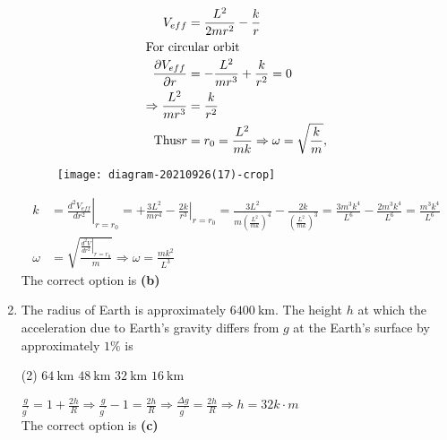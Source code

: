 \begin{enumerate}
\begin{answer}
	\begin{minipage}{0.5\textwidth}
	\begin{align*}
	V_{e f f}&=\frac{L^{2}}{2 m r^{2}}-\frac{k}{r} \\
	\intertext{For circular orbit} \frac{\partial V_{e f f}}{\partial r}&=-\frac{L^{2}}{m r^{3}}+\frac{k}{r^{2}}=0 \\
	\Rightarrow \frac{L^{2}}{m r^{3}}&=\frac{k}{r^{2}} \\
	\text{Thus} r&=r_{0}=\frac{L^{2}}{m k} \Rightarrow \omega=\sqrt{\frac{k}{m}},
	\end{align*}
	\end{minipage}
\begin{minipage}{0.5\textwidth}
\begin{figure}[H]
	\centering
	\texttt{[image: diagram-20210926(17)-crop]}
\end{figure}
\end{minipage}
 \begin{align*}
 k&=\left.\frac{d^{2} V_{e f f}}{d r^{2}}\right|_{r=r_{0}}=+\frac{3 L^{2}}{m r^{4}}-\left.\frac{2 k}{r^{3}}\right|_{r=r_{0}}=\frac{3 L^{2}}{m\left(\frac{L^{2}}{m k}\right)^{4}}-\frac{2 k}{\left(\frac{L^{2}}{m k}\right)^{3}}=\frac{3 m^{3} k^{4}}{L^{6}}-\frac{2 m^{3} k^{4}}{L^{6}}=\frac{m^{3} k^{4}}{L^{6}}\\
 \omega&=\sqrt{\frac{\left.\frac{d^{2} V}{d r^{2}}\right|_{r=r_{0}}}{m}} \Rightarrow \omega=\frac{m k^{2}}{L^{3}}
 \end{align*}
 The correct option is \textbf{(b)}	
\end{answer}

\item The radius of Earth is approximately $6400 \mathrm{~km}$. The height $h$ at which the acceleration due to Earth's gravity differs from $g$ at the Earth's surface by approximately $1 \%$ is
	{}
\begin{tasks}(2)
	\task[\textbf{A.}] $64 \mathrm{~km}$
	\task[\textbf{B.}] $48 \mathrm{~km}$
	\task[\textbf{C.}]$32 \mathrm{~km}$
	\task[\textbf{D.}]$16 \mathrm{~km}$
\end{tasks}
\begin{answer}
$\frac{g}{g^{\prime}}=1+\frac{2 h}{R} \Rightarrow \frac{g}{g^{\prime}}-1=\frac{2 h}{R} \Rightarrow \frac{\Delta g}{g^{\prime}}=\frac{2 h}{R} \Rightarrow h=32 k \cdot m$\\
The correct option is \textbf{(c)}	
\end{answer}


\end{enumerate}
